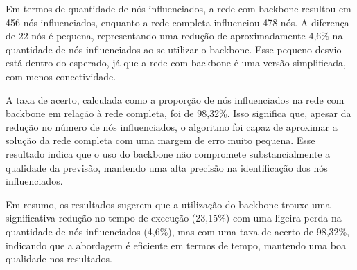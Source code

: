 \documentclass[12pt]{article}
\begin{document}
Em termos de quantidade de nós influenciados, a rede com backbone resultou em 456 nós influenciados, enquanto a rede completa influenciou 478 nós. A diferença de 22 nós é pequena, representando uma redução de aproximadamente 4,6\% na quantidade de nós influenciados ao se utilizar o backbone. Esse pequeno desvio está dentro do esperado, já que a rede com backbone é uma versão simplificada, com menos conectividade.

A taxa de acerto, calculada como a proporção de nós influenciados na rede com backbone em relação à rede completa, foi de 98,32\%. Isso significa que, apesar da redução no número de nós influenciados, o algoritmo foi capaz de aproximar a solução da rede completa com uma margem de erro muito pequena. Esse resultado indica que o uso do backbone não compromete substancialmente a qualidade da previsão, mantendo uma alta precisão na identificação dos nós influenciados.

Em resumo, os resultados sugerem que a utilização do backbone trouxe uma significativa redução no tempo de execução (23,15\%) com uma ligeira perda na quantidade de nós influenciados (4,6\%), mas com uma taxa de acerto de 98,32\%, indicando que a abordagem é eficiente em termos de tempo, mantendo uma boa qualidade nos resultados.
    


    


\printbibliography  %
\end{document}
